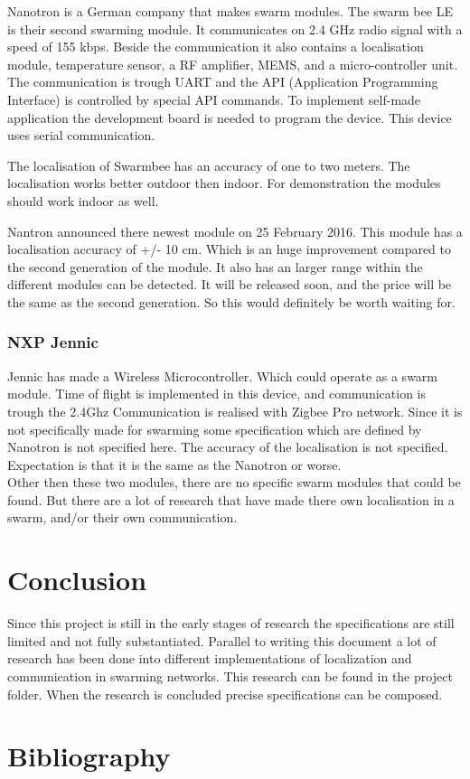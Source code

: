 \documentclass[10pt,a4paper]{article}
\begin{document}
Nanotron is a German company that makes swarm modules. The swarm bee LE is their second swarming module. It communicates on 2.4 GHz radio signal with a speed of 155 kbps. Beside the communication it also contains a localisation module, temperature sensor, a RF amplifier, MEMS, and a micro-controller unit. The communication is trough UART and the API (Application Programming Interface) is controlled by special API commands. To implement self-made application the development board is needed to program the device. This device uses serial communication. 

The localisation of Swarmbee has an accuracy of one to two meters. The localisation works better outdoor then indoor. For demonstration the modules should work indoor as well. \cite{etotaal}

Nantron announced there newest module on 25 February 2016. This module has a localisation accuracy of +/- 10 cm. Which is an huge improvement compared to the second generation of the module. It also has an larger range within the different modules can be detected. It will be released soon, and the price will be the same as the second generation. So this would definitely be worth waiting for. \cite{nanotron}
	
\subsubsection{NXP Jennic} 

Jennic has made a Wireless Microcontroller. Which could operate as a swarm module. Time of flight is implemented in this device, and communication is trough the 2.4Ghz Communication is realised with Zigbee Pro network. Since it is not specifically made for swarming some specification which are defined by Nanotron is not specified here. The accuracy of the localisation is not specified. Expectation is that it is the same as the Nanotron or worse. \cite{wirelessmicrocontroller}\\

Other then these two modules, there are no specific swarm modules that could be found. But there are a lot of research that have made there own localisation in a swarm, and/or their own communication. 

\newpage
\section{Conclusion}
Since this project is still in the early stages of research the specifications are still limited and not fully substantiated. Parallel to writing this document a lot of research has been done into different implementations of localization and communication in swarming networks. This research can be found in the project folder. When the research is concluded precise specifications can be composed. 

\newpage



\section{Bibliography}


\end{document}
